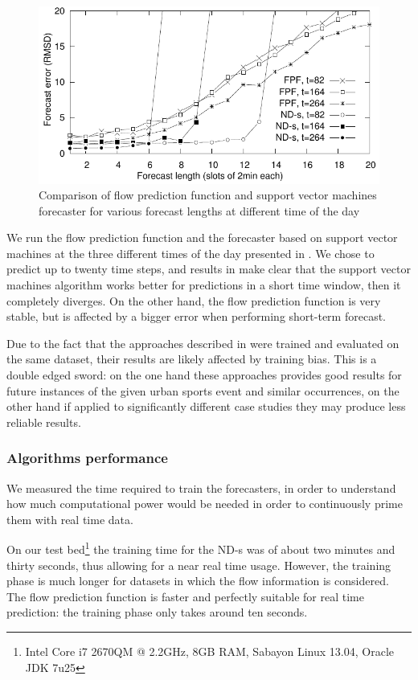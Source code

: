 \documentclass[12pt,a4paper,twoside,openright]{book}
\begin{document}
\begin{figure}
    \centering
    \includegraphics[width=0.9\columnwidth]{img/error}
    \caption[Errors of forecasters]{Comparison of flow prediction function and support vector machines forecaster for various forecast lengths at different time of the day}
    \label{fig:error}
\end{figure}
%
We run the flow prediction function and the forecaster based on support vector machines at the three different times of the day presented in .
%
We chose to predict up to twenty time steps, and results in  make clear that the support vector machines algorithm works better for predictions in a short time window, then it completely diverges.
%
On the other hand, the flow prediction function is very stable, but is affected by a bigger error when performing short-term forecast.

Due to the fact that the approaches described in  were trained and evaluated on the same dataset, their results are likely affected by training bias.
%
This is a double edged sword: on the one hand these approaches provides good results for future instances of the given urban sports event and similar occurrences, on the other hand if applied to significantly different case studies they may produce less reliable results.

\subsubsection{Algorithms performance}
We measured the time required to train the forecasters, in order to understand how much computational power would be needed in order to continuously prime them with real time data.

On our test bed\footnote{Intel Core i7 2670QM @ 2.2GHz, 8GB RAM, Sabayon Linux 13.04, Oracle JDK 7u25} the training time for the ND-s was of about two minutes and thirty seconds, thus allowing for a near real time usage.
%
However, the training phase is much longer for datasets in which the flow information is considered.
%
The flow prediction function is faster and perfectly suitable for real time prediction: the training phase only takes around ten seconds.
\end{document}
